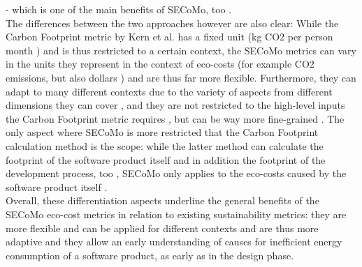 \documentclass[oribibl]{llncs}
\begin{document}
\cite{kern_impacts_2015} - which is one of the main benefits of SECoMo, too \cite{schulze_cost_2016}.\\ %
The differences between the two approaches however are also clear: While the Carbon Footprint metric by Kern et al. has a fixed unit (kg CO2 per person month \cite{kern_impacts_2015}) and is thus restricted to a certain context, the SECoMo metrics can vary in the units they represent in the context of eco-costs (for example CO2 %
emissions, but also dollars \cite{schulze_cost_2016}) and are thus far more flexible. Furthermore, they can adapt to many different contexts due to the variety of aspects from different dimensions they can cover \cite{schulze_cost_2016}, and they are not restricted to the high-level inputs the Carbon Footprint metric requires \cite{kern_impacts_2015}, but can be way more fine-grained \cite{schulze_cost_2016}. The only aspect where SECoMo is more restricted that the Carbon Footprint calculation method is the scope: while the latter method can calculate the footprint of the software product itself and in addition the footprint of the development process, too \cite{kern_impacts_2015}, SECoMo only applies to the eco-costs caused by the software product itself \cite{schulze_cost_2016}. %
\\ Overall, these differentiation aspects underline the general benefits of the SECoMo eco-cost metrics in relation to existing sustainability metrics: they are more flexible and can be applied for different contexts and are  thus more adaptive and they allow an early understanding of causes for inefficient energy consumption of a software product, as early as in the design phase. %
\end{document}
